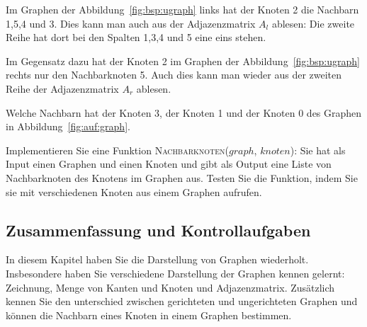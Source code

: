 \begin{mbsp}
Im Graphen der Abbildung~\ref{fig:bsp:ugraph} links hat der Knoten 2 die Nachbarn 1,5,4 und 3. 
Dies kann man auch aus der Adjazenzmatrix $A_l$ ablesen: Die zweite Reihe hat dort bei den Spalten 1,3,4 und 5 eine eins stehen.

Im Gegensatz dazu hat der Knoten 2 im Graphen der Abbildung~\ref{fig:bsp:ugraph} rechts nur den Nachbarknoten 5. 
Auch dies kann man wieder aus der zweiten Reihe der Adjazenzmatrix $A_r$ ablesen.
\end{mbsp}

\begin{aufg}
Welche Nachbarn hat der Knoten 3, der Knoten 1 und der Knoten 0 des Graphen in Abbildung~\ref{fig:auf:graph}.
\end{aufg}


\begin{prog}
Implementieren Sie eine Funktion \textsc{Nachbarknoten($graph$, $knoten$)}: Sie hat als Input einen Graphen und einen Knoten und gibt als Output eine Liste von Nachbarknoten des Knotens im Graphen aus. Testen Sie die Funktion, indem Sie sie mit verschiedenen Knoten aus einem Graphen aufrufen.
\end{prog}

\subsection{Zusammenfassung und Kontrollaufgaben}

In diesem Kapitel haben Sie die Darstellung von Graphen wiederholt. 
Insbesondere haben Sie verschiedene Darstellung der Graphen kennen gelernt: Zeichnung, Menge von Kanten und Knoten und Adjazenzmatrix.
Zusätzlich kennen Sie den unterschied zwischen gerichteten und ungerichteten Graphen und können die Nachbarn eines Knoten in einem Graphen bestimmen. 



